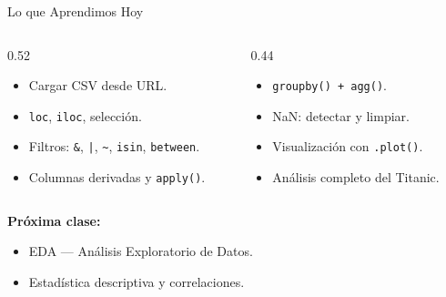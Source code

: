 \documentclass[aspectratio=169, 11pt]{beamer}
\begin{document}
\begin{frame}{Lo que Aprendimos Hoy}
  \vspace{-4pt}
  \begin{columns}[T]
    \begin{column}{0.52\textwidth}
      {\footnotesize
      \begin{itemize}\setlength{\itemsep}{4pt}
        \item[{\color{codeGreen}\faCheckCircle}]
          Cargar CSV desde URL.
        \item[{\color{codeGreen}\faCheckCircle}]
          \texttt{loc}, \texttt{iloc}, selección.
        \item[{\color{codeGreen}\faCheckCircle}]
          Filtros: \texttt{\&}, \texttt{|}, \texttt{\~{}},
          \texttt{isin}, \texttt{between}.
        \item[{\color{codeGreen}\faCheckCircle}]
          Columnas derivadas y \texttt{apply()}.
      \end{itemize}
      }
    \end{column}

    \begin{column}{0.44\textwidth}
      {\footnotesize
      \begin{itemize}\setlength{\itemsep}{4pt}
        \item[{\color{codeGreen}\faCheckCircle}]
          \texttt{groupby() + agg()}.
        \item[{\color{codeGreen}\faCheckCircle}]
          NaN: detectar y limpiar.
        \item[{\color{codeGreen}\faCheckCircle}]
          Visualización con \texttt{.plot()}.
        \item[{\color{codeGreen}\faCheckCircle}]
          Análisis completo del Titanic.
      \end{itemize}
      }
    \end{column}
  \end{columns}

  \vspace{6pt}
  {\small\color{arcaDark}\bfseries Próxima clase:}
  \vspace{2pt}
  {\footnotesize
  \begin{itemize}\setlength{\itemsep}{2pt}
    \item[{\color{arcaRed}\faArrowRight}]
      EDA --- Análisis Exploratorio de Datos.
    \item[{\color{arcaRed}\faArrowRight}]
      Estadística descriptiva y correlaciones.
  \end{itemize}
  }
\end{frame}
\end{document}
